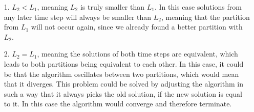 \documentclass[%
   10pt,              %
   a4paper,           %
   DIV10,             %
]{scrartcl}%
\begin{document}
\begin{itemize}
\begin{enumerate}
		\begin{enumerate}
			\item[1.] $L_2 < L_1$, meaning $L_2$ is truly smaller than $L_1$. In this case solutions from any later time step will always be smaller than $L_2$, meaning that the partition from $L_1$ will not occur again, since we already found a better partition with $L_2$. 
			\item[2.] $L_2 = L_1$, meaning the solutions of both time steps are equivalent, which leads to both partitions being equivalent to each other. In this case, it could be that the algorithm oscillates between two partitions, which would mean that it diverges. This problem could be solved by adjusting the algorithm in such a way that it always picks the old solution, if the new solution is equal to it. In this case the algorithm would converge and therefore terminate.  
		\end{enumerate}
	\end{enumerate}
\end{itemize}
\end{document}
